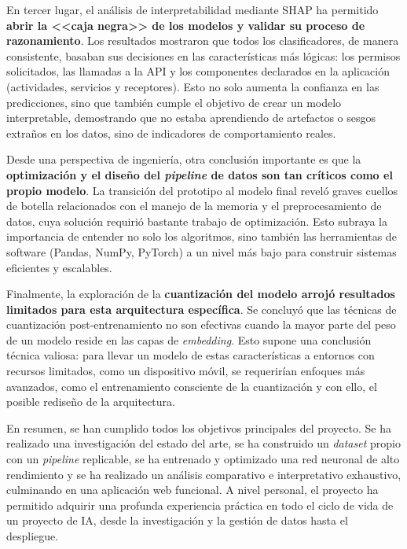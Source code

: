 En tercer lugar, el análisis de interpretabilidad mediante SHAP ha permitido \textbf{abrir la <<caja negra>> de los modelos y validar su proceso de razonamiento}. Los resultados mostraron que todos los clasificadores, de manera consistente, basaban sus decisiones en las características más lógicas: los permisos solicitados, las llamadas a la API y los componentes declarados en la aplicación (actividades, servicios y receptores). Esto no solo aumenta la confianza en las predicciones, sino que también cumple el objetivo de crear un modelo interpretable, demostrando que no estaba aprendiendo de artefactos o sesgos extraños en los datos, sino de indicadores de comportamiento reales.

Desde una perspectiva de ingeniería, otra conclusión importante es que la \textbf{optimización y el diseño del \textit{pipeline} de datos son tan críticos como el propio modelo}. La transición del prototipo al modelo final reveló graves cuellos de botella relacionados con el manejo de la memoria y el preprocesamiento de datos, cuya solución requirió bastante trabajo de optimización. Esto subraya la importancia de entender no solo los algoritmos, sino también las herramientas de software (Pandas, NumPy, PyTorch) a un nivel más bajo para construir sistemas eficientes y escalables.

Finalmente, la exploración de la \textbf{cuantización del modelo arrojó resultados limitados para esta arquitectura específica}. Se concluyó que las técnicas de cuantización post-entrenamiento no son efectivas cuando la mayor parte del peso de un modelo reside en las capas de \textit{embedding}. Esto supone una conclusión técnica valiosa: para llevar un modelo de estas características a entornos con recursos limitados, como un dispositivo móvil, se requerirían enfoques más avanzados, como el entrenamiento consciente de la cuantización y con ello, el posible rediseño de la arquitectura.

En resumen, se han cumplido todos los objetivos principales del proyecto. Se ha realizado una investigación del estado del arte, se ha construido un \textit{dataset} propio con un \textit{pipeline} replicable, se ha entrenado y optimizado una red neuronal de alto rendimiento y se ha realizado un análisis comparativo e interpretativo exhaustivo, culminando en una aplicación web funcional. A nivel personal, el proyecto ha permitido adquirir una profunda experiencia práctica en todo el ciclo de vida de un proyecto de IA, desde la investigación y la gestión de datos hasta el despliegue.

